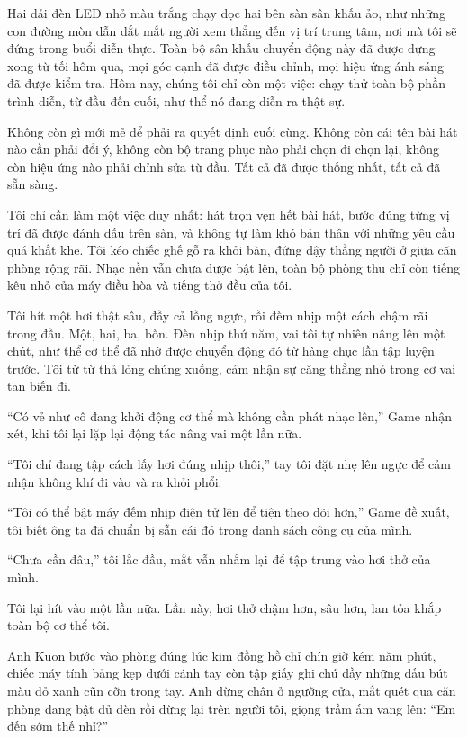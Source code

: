 ﻿\documentclass[../main.tex]{subfiles}
\begin{document}
Hai dải đèn LED nhỏ màu trắng chạy dọc hai bên sàn sân khấu ảo, như những con đường mòn dẫn dắt mắt người xem thẳng đến vị trí trung tâm, nơi mà tôi sẽ đứng trong buổi diễn thực. Toàn bộ sân khấu chuyển động này đã được dựng xong từ tối hôm qua, mọi góc cạnh đã được điều chỉnh, mọi hiệu ứng ánh sáng đã được kiểm tra. Hôm nay, chúng tôi chỉ còn một việc: chạy thử toàn bộ phần trình diễn, từ đầu đến cuối, như thể nó đang diễn ra thật sự.

Không còn gì mới mẻ để phải ra quyết định cuối cùng. Không còn cái tên bài hát nào cần phải đổi ý, không còn bộ trang phục nào phải chọn đi chọn lại, không còn hiệu ứng nào phải chỉnh sửa từ đầu. Tất cả đã được thống nhất, tất cả đã sẵn sàng.

Tôi chỉ cần làm một việc duy nhất: hát trọn vẹn hết bài hát, bước đúng từng vị trí đã được đánh dấu trên sàn, và không tự làm khó bản thân với những yêu cầu quá khắt khe. Tôi kéo chiếc ghế gỗ ra khỏi bàn, đứng dậy thẳng người ở giữa căn phòng rộng rãi. Nhạc nền vẫn chưa được bật lên, toàn bộ phòng thu chỉ còn tiếng kêu nhỏ của máy điều hòa và tiếng thở đều của tôi.

Tôi hít một hơi thật sâu, đầy cả lồng ngực, rồi đếm nhịp một cách chậm rãi trong đầu. Một, hai, ba, bốn. Đến nhịp thứ năm, vai tôi tự nhiên nâng lên một chút, như thể cơ thể đã nhớ được chuyển động đó từ hàng chục lần tập luyện trước. Tôi từ từ thả lỏng chúng xuống, cảm nhận sự căng thẳng nhỏ trong cơ vai tan biến đi.

``Có vẻ như cô đang khởi động cơ thể mà không cần phát nhạc lên,'' Game nhận xét, khi tôi lại lặp lại động tác nâng vai một lần nữa.

``Tôi chỉ đang tập cách lấy hơi đúng nhịp thôi,'' tay tôi đặt nhẹ lên ngực để cảm nhận không khí đi vào và ra khỏi phổi.

``Tôi có thể bật máy đếm nhịp điện tử lên để tiện theo dõi hơn,'' Game đề xuất, tôi biết ông ta đã chuẩn bị sẵn cái đó trong danh sách công cụ của mình.

``Chưa cần đâu,'' tôi lắc đầu, mắt vẫn nhắm lại để tập trung vào hơi thở của mình.

Tôi lại hít vào một lần nữa. Lần này, hơi thở chậm hơn, sâu hơn, lan tỏa khắp toàn bộ cơ thể tôi.

\ct

Anh Kuon bước vào phòng đúng lúc kim đồng hồ chỉ chín giờ kém năm phút, chiếc máy tính bảng kẹp dưới cánh tay còn tập giấy ghi chú đầy những dấu bút màu đỏ xanh cũn cỡn trong tay. Anh dừng chân ở ngưỡng cửa, mắt quét qua căn phòng đang bật đủ đèn rồi dừng lại trên người tôi, giọng trầm ấm vang lên: ``Em đến sớm thế nhỉ?''
\end{document}
